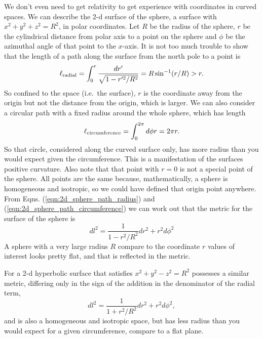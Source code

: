 We don't even need to get relativity to get experience with coordinates in curved spaces.  We can describe the 2-d surface of the sphere, a surface with $x^2 + y^2 + z^2 = R^2$, in polar coordinates.  Let $R$ be the radius of the sphere, $r$ be the cylindrical distance from polar axis to a point on the sphere and $\phi$ be the azimuthal angle of that point to the $x$-axis.  It is not too much trouble to show that the length of a path along the surface from the north pole to a point is 
\begin{equation}
  \ell_{\rm radial} = \int_0^r \frac{dr'}{\sqrt{1-r'^2/R^2}} = R \sin^{-1}(r/R) > r. \label{eqn:2d_sphere_path_radius}
\end{equation}
So confined to the space (i.e.\ the surface), $r$ is the coordinate away from the origin but not the distance from the origin, which is larger.
We can also consider a circular path with a fixed radius around the whole sphere, which has length
\begin{equation}
  \ell_{\rm circumference} = \int_0^{2\pi} d\phi r = 2\pi r.  \label{eqn:2d_sphere_path_circumference}
\end{equation}
So that circle, considered along the curved surface only, has more radius than you would expect given the circumference.  This is a manifestation of the surfaces positive curvature.  Also note that that point with $r=0$ is not a special point of the sphere.  All points are the same because, mathematically, a sphere is homogeneous and isotropic, so we could have defined that origin point anywhere. From Eqns. (\ref{eqn:2d_sphere_path_radius}) and (\ref{eqn:2d_sphere_path_circumference}) we can work out that the metric for the surface of the sphere is
\begin{equation}
  dl^2 = \frac{1}{1-r^2/R^2} dr^2 + r^2 d\phi^2
\end{equation}
A sphere with a very large radius $R$ compare to the coordinate $r$ values of interest looks pretty flat, and that is reflected in the metric.

For a 2-d hyperbolic surface that satisfies $x^2 + y^2 - z^2 = R^2$ possesses a similar metric, differing only in the sign of the addition in the denominator of the radial term,
\begin{equation}
    dl^2 = \frac{1}{1+r^2/R^2} dr^2 + r^2 d\phi^2,
\end{equation}
and is also a homogeneous and isotropic space, but has less radius than you would expect for a given circumference, compare to a flat plane.

